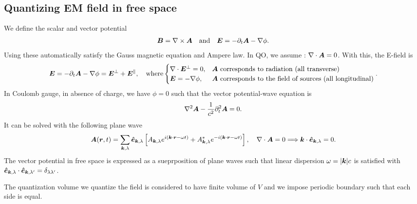 \subsection{Quantizing EM field in free space}
We define the scalar and vector potential 
\begin{align*}
    \bm{B}=\nabla\times\bm{A}\quad\text{and}\quad\bm{E}=-\partial_t\bm{A}-\nabla\phi.
\end{align*}
Using these automatically satisfy the Gauss magnetic equation and Ampere law. In QO, we assume : $\nabla\cdot\bm{A}=0$.
With this, the E-field is 
\begin{align*}
    \bm{E}=-\partial_t\bm{A}-\nabla\phi=\bm{E}^\perp+\bm{E}^\parallel,\quad\text{where}\begin{cases}
        \nabla\cdot\bm{E}^\perp=0,&\text{$\bm{A}$ corresponds to radiation (all transverse)}\\
        \bm{E}=-\nabla\phi,&\text{$\bm{A}$ corresponds to the field of sources (all longitudinal)}
    \end{cases}.
\end{align*}
In Coulomb gauge, in absence of charge, we have $\phi=0$ such that the vector potential-wave equation is 
\begin{align*}
    \nabla^2\bm{A}-\frac{1}{c^2}\partial_t^2\bm{A}=0.
\end{align*}
It can be solved with the following plane wave 
\begin{align*}
    \bm{A}(\bm{r},t)=\sum_{\bm{k},\lambda}\bm{\hat{e}}_{\bm{k},\lambda}\left[A_{\bm{k},\lambda}e^{i(\bm{k}\cdot\bm{r}-\omega t)}+A^*_{\bm{k},\lambda}e^{-i(\bm{k}\cdot\bm{r}-\omega t)}\right],\quad\nabla\cdot\bm{A}=0\Longrightarrow\bm{k}\cdot\bm{\hat{e}}_{\bm{k},\lambda}=0.
\end{align*}
The vector potential in free space is expressed as a sueprposition of plane waves such that linear dispersion $\omega=|\bm{k}|c$ is satisfied with 
$\bm{\hat{e}}_{\bm{k},\lambda}\cdot\bm{\hat{e}}_{\bm{k},\lambda'}=\delta_{\lambda\lambda'}$.

The quantization volume we quantize the field is considered to have finite volume of $V$ and we impose periodic boundary such that each side is equal.

